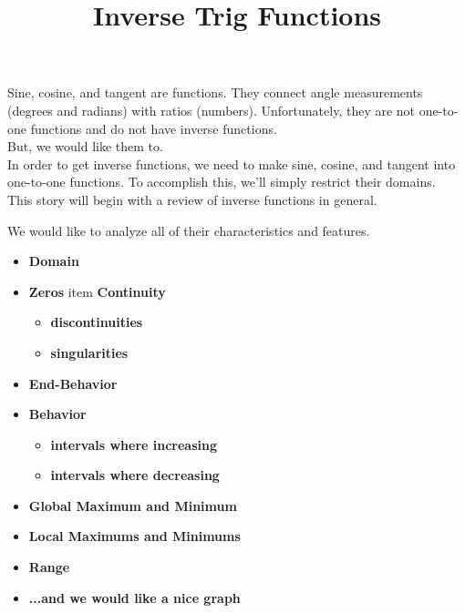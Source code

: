 \documentclass{ximera}
\title{Inverse Trig Functions}
\begin{document}
\begin{abstract}
%
\end{abstract}
\maketitle




Sine, cosine, and tangent are functions. They connect angle measurements (degrees and radians) with ratios (numbers). Unfortunately, they are not one-to-one functions and do not have inverse functions. \\

But, we would like them to.\\

In order to get inverse functions, we need to make sine, cosine, and tangent into one-to-one functions.  To accomplish this, we'll simply restrict their domains. \\


This story will begin with a review of inverse functions in general.



We would like to analyze all of their characteristics and features. \\



\begin{itemize}
\item \textbf{\textcolor{red!80!black}{Domain}} 
\item \textbf{\textcolor{red!80!black}{Zeros}} 
item \textbf{\textcolor{red!80!black}{Continuity}} 
  \begin{itemize}
     \item \textbf{\textcolor{purple!85!blue}{discontinuities}} 
     \item \textbf{\textcolor{purple!85!blue}{singularities}} 
  \end{itemize}
\item \textbf{\textcolor{red!80!black}{End-Behavior}} 
\item \textbf{\textcolor{red!80!black}{Behavior}} 
  \begin{itemize}
     \item \textbf{\textcolor{purple!85!blue}{intervals where increasing}} 
     \item \textbf{\textcolor{purple!85!blue}{intervals where decreasing}} 
  \end{itemize}
\item \textbf{\textcolor{red!80!black}{Global Maximum and Minimum}} 
\item \textbf{\textcolor{red!80!black}{Local Maximums and Minimums}} 
\item \textbf{\textcolor{red!80!black}{Range}} 
\item \textbf{\textcolor{blue!55!black}{...and we would like a nice graph}} 
\end{itemize}
\end{document}
